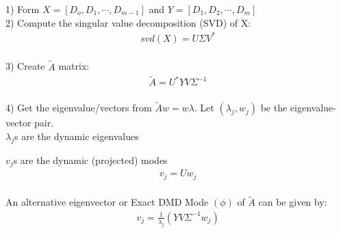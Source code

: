 \documentclass{article}
\begin{document}
1) Form $X=[D_o,D_1, \cdots ,D_{m-1}]$ and $Y=[D_1,D_2, \cdots,D_m]$\\

2) Compute the singular value decomposition (SVD) of X:
\begin{align*}
svd(X) = U\Sigma V^*
\end{align*}\\

3) Create $\tilde{A}$ matrix:
\begin{align*}
\tilde{A}=U^*YV\Sigma ^{-1}
\end{align*}\\

4) Get the eigenvalue/vectors from $\tilde{A}w=w\lambda$. Let $(\lambda_j,w_j)$ be the eigenvalue-vector pair.\\

$\lambda_j$s are the dynamic eigenvalues\

$v_j$s are the dynamic (projected) modes\\

\begin{align*}
v_j=Uw_j
\end{align*}\\

An alternative eigenvector or Exact DMD Mode $(\phi)$ of $\tilde{A}$ can be given by:
\begin{align*}
v_j = \frac{1}{\lambda_j}(YV\Sigma^{-1}w_j)
\end{align*}

%
%
\end{document}
